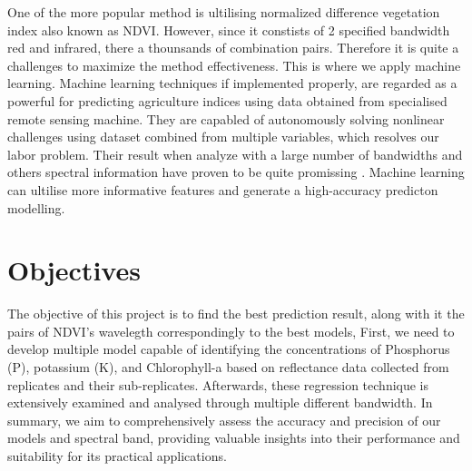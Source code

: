 One of the more popular method is ultilising normalized difference vegetation index also known as NDVI. However, since it constists of 2 specified bandwidth red and infrared, there a thounsands of combination pairs. Therefore it is quite a challenges to maximize the method effectiveness. This is where we apply machine learning. Machine learning techniques if implemented properly, are regarded as a powerful for predicting agriculture indices using data obtained from specialised remote sensing machine\cite{behmann2015review}. They are capabled of autonomously solving nonlinear challenges using dataset combined from multiple variables, which resolves our labor problem. Their result when analyze with a large number of bandwidths and others spectral information have proven to be quite promissing \cite{van2014gaussian}. Machine learning can ultilise more informative features and generate a high-accuracy predicton modelling\cite{panda2010application}.

\section{Objectives}
The objective of this project is to find the best prediction result, along with it the pairs of NDVI's wavelegth correspondingly to the best models, First, we need to develop multiple model capable of identifying the concentrations of Phosphorus (P), potassium (K), and Chlorophyll-a based on reflectance data collected from replicates and their sub-replicates. Afterwards, these regression technique is extensively examined and analysed through multiple different bandwidth. In summary, we aim to comprehensively assess the accuracy and precision of our models and spectral band, providing valuable insights into their performance and suitability for its practical applications.

